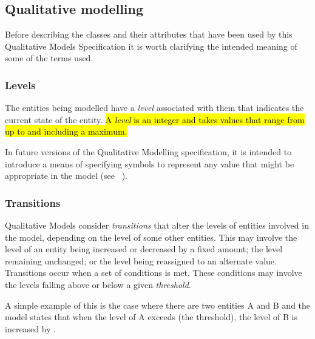 \pagebreak
\subsection{Qualitative modelling}
\label{qual}

Before describing the classes and their attributes that have been used by this Qualitative Models Specification it is worth clarifying the intended meaning of some of the terms used. 

\subsubsection{Levels}


The entities being modelled have a \emph{level} associated with them that indicates the current state of the entity. \hl{A \emph{level} is an integer and takes values that range from  up to and including a maximum.}

In future versions of the Qualitative Modelling specification, it is intended to introduce a means of specifying symbols to represent any value that might be appropriate in the model (see ~).

\smallskip

\subsubsection{Transitions}

Qualitative Models consider \emph{transitions} that alter the levels of entities involved in the model, depending on the level of some other entities.  This may involve the level of an entity being increased or decreased by a fixed amount; the level remaining unchanged; or the level being reassigned to an alternate value. Transitions occur when a set of conditions is met. These conditions may involve the levels falling above or below  a given \emph{threshold}. 

A simple example of this is the case where there are two entities A and B and the model states that when the level of A exceeds  (the threshold), the level of B is increased by . 

